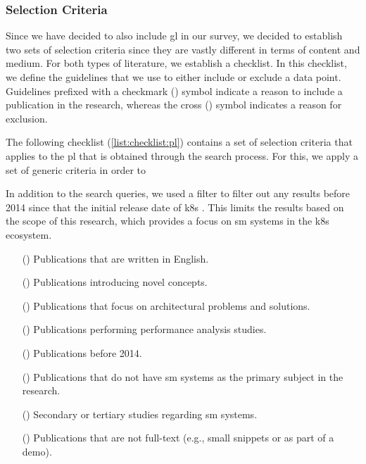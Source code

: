 



\subsubsection{Selection Criteria}
\label{sec:survey:methodology:review-protocol:selection-criteria}
Since we have decided to also include \gls{gl} in our survey, we decided to establish two sets of selection criteria since they are vastly different in terms of content and medium. For both types of literature, we establish a checklist. In this checklist, we define the guidelines that we use to either include or exclude a data point. Guidelines prefixed with a checkmark (\cmark) symbol indicate a reason to include a publication in the research, whereas the cross (\xmark) symbol indicates a reason for exclusion. 

The following checklist (\cref{list:checklist:pl}) contains a set of selection criteria that applies to the \gls{pl} that is obtained through the search process. For this, we apply a set of generic criteria in order to 

In addition to the search queries, we used a filter to filter out any results before 2014 since that the initial release date of \gls{k8s} \cite{kubernetes-overview}. This limits the results based on the scope of this research, which provides a focus on \gls{sm} systems in the \gls{k8s} ecosystem.

\begin{itemize}
    \item[(\cmark)] Publications that are written in English.
    \item[(\cmark)] Publications introducing novel concepts.
    \item[(\cmark)] Publications that focus on architectural problems and solutions.
    \item[(\cmark)] Publications performing performance analysis studies.
    
    \item[(\xmark)] Publications before 2014. 
    \item[(\xmark)] Publications that do not have \gls{sm} systems as the primary subject in the research. 
    \item[(\xmark)] Secondary or tertiary studies regarding \gls{sm} systems.
    \item[(\xmark)] Publications that are not full-text (e.g., small snippets or as part of a demo).
    
    \label{list:checklist:pl}
\end{itemize}


